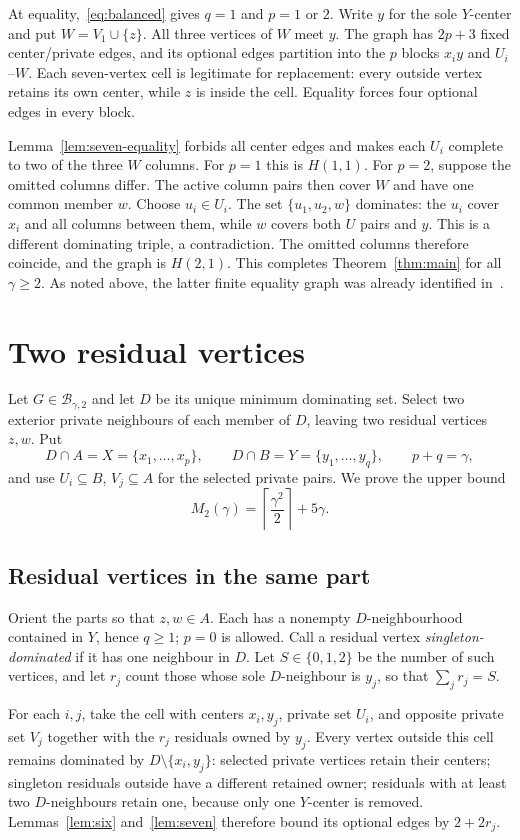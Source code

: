 \documentclass[11pt]{article}
\theoremstyle{definition}
\theoremstyle{remark}
\newcommand{\ceil}[1]{\left\lceil#1\right\rceil}
\begin{document}
At equality,~\eqref{eq:balanced} gives $q=1$ and $p=1$ or $2$.
Write $y$ for the sole $Y$-center and put $W=V_1\cup\{z\}$. All three
vertices of $W$ meet $y$. The graph has $2p+3$ fixed center/private edges,
and its optional edges partition into the $p$ blocks $x_i y$ and $U_i$--$W$.
Each seven-vertex cell is legitimate for replacement: every outside vertex
retains its own center, while $z$ is inside the cell. Equality forces four
optional edges in every block.

Lemma~\ref{lem:seven-equality} forbids all center edges and makes each $U_i$
complete to two of the three $W$ columns. For $p=1$ this is $H(1,1)$.
For $p=2$, suppose the omitted columns differ. The active column pairs
then cover $W$ and have one common member $w$. Choose $u_i\in U_i$.
The set $\{u_1,u_2,w\}$ dominates: the $u_i$ cover $x_i$ and all columns
between them, while $w$ covers both $U$ pairs and $y$. This is a different
dominating triple, a contradiction. The omitted columns therefore coincide,
and the graph is $H(2,1)$. This completes Theorem~\ref{thm:main} for all
$\gamma\ge2$. As noted above, the latter finite equality graph was already
identified in~\cite{KN}.

\section{Two residual vertices}\label{sec:two}

Let $G\in\mathcal B_{\gamma,2}$ and let $D$ be its unique minimum dominating
set. Select two exterior private neighbours of each member of $D$, leaving
two residual vertices $z,w$. Put
\[
 D\cap A=X=\{x_1,\ldots,x_p\},\qquad
 D\cap B=Y=\{y_1,\ldots,y_q\},\qquad p+q=\gamma,
\]
and use $U_i\subseteq B$, $V_j\subseteq A$ for the selected private pairs.
We prove the upper bound
\[
 M_2(\gamma)=\ceil{\frac{\gamma^2}{2}}+5\gamma.
\]

\subsection{Residual vertices in the same part}

Orient the parts so that $z,w\in A$. Each has a nonempty $D$-neighbourhood
contained in $Y$, hence $q\ge1$; $p=0$ is allowed. Call a residual vertex
\emph{singleton-dominated} if it has one neighbour in $D$. Let $S\in\{0,1,2\}$
be the number of such vertices, and let $r_j$ count those whose sole
$D$-neighbour is $y_j$, so that $\sum_jr_j=S$.

For each $i,j$, take the cell with centers $x_i,y_j$, private set $U_i$,
and opposite private set $V_j$ together with the $r_j$ residuals owned by
$y_j$. Every vertex outside this cell remains dominated by
$D\setminus\{x_i,y_j\}$: selected private vertices retain their centers;
singleton residuals outside have a different retained owner; residuals
with at least two $D$-neighbours retain one, because only one $Y$-center
is removed. Lemmas~\ref{lem:six} and~\ref{lem:seven} therefore bound its
optional edges by $2+2r_j$.
\end{document}
